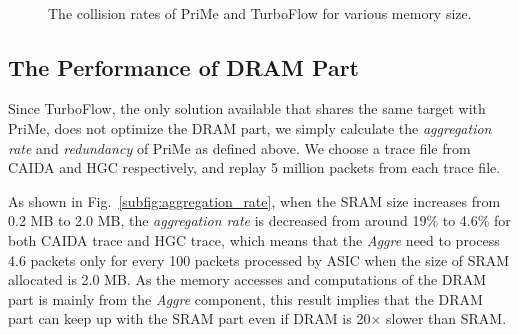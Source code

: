\documentclass[10pt, conference, letterpaper]{IEEEtran}
\begin{document}
\begin{figure}[t]
	\centering
	\mbox{
	}
	\caption{The collision rates of PriMe and TurboFlow for various memory size.}
	\label{fig:collision_rates_with_various_memory_size}
\end{figure} 

\subsection{The Performance of DRAM Part}
Since TurboFlow, the only solution available that shares the same target with PriMe, does not optimize the DRAM part, we simply calculate the \emph{aggregation rate} and \emph{redundancy} of PriMe as defined above. We choose a trace file from CAIDA and HGC respectively, and replay 5 million packets from each trace file. 

As shown in Fig.~\ref{subfig:aggregation_rate}, when the SRAM size increases from 0.2 MB to 2.0 MB, the \emph{aggregation rate} is decreased from around 19\% to 4.6\% for both CAIDA trace and HGC trace, which means that the \emph{Aggre} need to process 4.6 packets only for every 100 packets processed by ASIC when the size of SRAM allocated is 2.0 MB. As the memory accesses and computations of the DRAM part is mainly from the \emph{Aggre} component, this result implies that the DRAM part can keep up with the SRAM part even if DRAM is 20$\times$ slower than SRAM.
\end{document}
